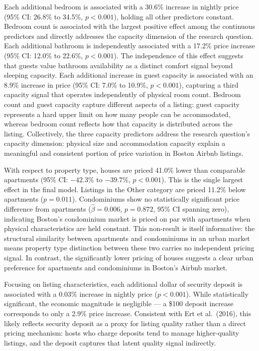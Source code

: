 \documentclass[
]{article}
\begin{document}
Each additional bedroom is associated with a 30.6\% increase in nightly
price (95\% CI: 26.8\% to 34.5\%, \(p < 0.001\)), holding all other
predictors constant. Bedroom count is associated with the largest
positive effect among the continuous predictors and directly addresses
the capacity dimension of the research question. Each additional
bathroom is independently associated with a 17.2\% price increase (95\%
CI: 12.0\% to 22.6\%, \(p < 0.001\)). The independence of this effect
suggests that guests value bathroom availability as a distinct comfort
signal beyond sleeping capacity. Each additional increase in guest
capacity is associated with an 8.9\% increase in price (95\% CI: 7.0\%
to 10.9\%, \(p < 0.001\)), capturing a third capacity signal that
operates independently of physical room count. Bedroom count and guest
capacity capture different aspects of a listing: guest capacity
represents a hard upper limit on how many people can be accommodated,
whereas bedroom count reflects how that capacity is distributed across
the listing. Collectively, the three capacity predictors address the
research question's capacity dimension: physical size and accommodation
capacity explain a meaningful and consistent portion of price variation
in Boston Airbnb listings.

With respect to property type, houses are priced 41.0\% lower than
comparable apartments (95\% CI: \(-42.3\%\) to \(-39.7\%\),
\(p < 0.001\)). This is the single largest effect in the final model.
Listings in the Other category are priced 11.2\% below apartments
(\(p = 0.011\)). Condominiums show no statistically significant price
difference from apartments (\(\hat{\beta} = 0.006\), \(p = 0.872\), 95\%
CI spanning zero), indicating Boston's condominium market is priced on
par with apartments when physical characteristics are held constant.
This non-result is itself informative: the structural similarity between
apartments and condominiums in an urban market means property type
distinction between these two carries no independent pricing signal. In
contrast, the significantly lower pricing of houses suggests a clear
urban preference for apartments and condominiums in Boston's Airbnb
market.

Focusing on listing characteristics, each additional dollar of security
deposit is associated with a 0.03\% increase in nightly price
(\(p < 0.001\)). While statistically significant, the economic magnitude
is negligible --- a \$100 deposit increase corresponds to only a 2.9\%
price increase. Consistent with Ert et al.~(2016), this likely reflects
security deposit as a proxy for listing quality rather than a direct
pricing mechanism: hosts who charge deposits tend to manage
higher-quality listings, and the deposit captures that latent quality
signal indirectly.
\end{document}
